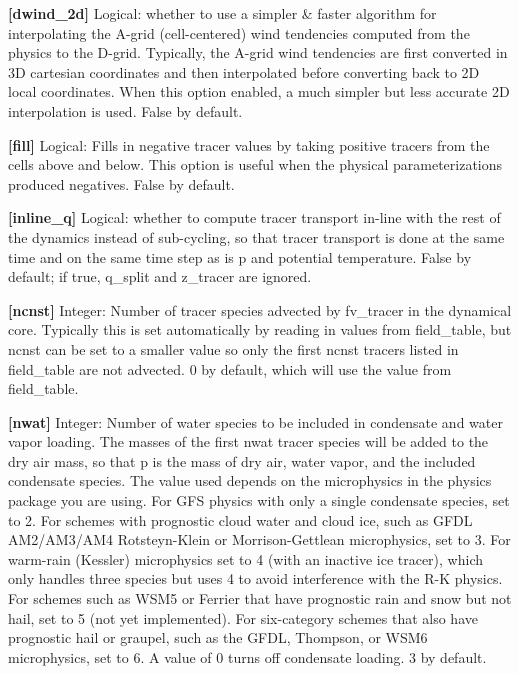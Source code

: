 {\bfseries \mbox{[}dwind\+\_\+2d\mbox{]}} Logical\+: whether to use a simpler \& faster algorithm for interpolating the A-\/grid (cell-\/centered) wind tendencies computed from the physics to the D-\/grid. Typically, the A-\/grid wind tendencies are first converted in 3D cartesian coordinates and then interpolated before converting back to 2D local coordinates. When this option enabled, a much simpler but less accurate 2D interpolation is used. False by default.

{\bfseries \mbox{[}fill\mbox{]}} Logical\+: Fills in negative tracer values by taking positive tracers from the cells above and below. This option is useful when the physical parameterizations produced negatives. False by default.

{\bfseries \mbox{[}inline\+\_\+q\mbox{]}} Logical\+: whether to compute tracer transport in-\/line with the rest of the dynamics instead of sub-\/cycling, so that tracer transport is done at the same time and on the same time step as is {\ttfamily p} and potential temperature. False by default; if true, q\+\_\+split and z\+\_\+tracer are ignored.

{\bfseries \mbox{[}ncnst\mbox{]}} Integer\+: Number of tracer species advected by fv\+\_\+tracer in the dynamical core. Typically this is set automatically by reading in values from field\+\_\+table, but ncnst can be set to a smaller value so only the first ncnst tracers listed in field\+\_\+table are not advected. 0 by default, which will use the value from field\+\_\+table.

{\bfseries \mbox{[}nwat\mbox{]}} Integer\+: Number of water species to be included in condensate and water vapor loading. The masses of the first nwat tracer species will be added to the dry air mass, so that {\ttfamily p} is the mass of dry air, water vapor, and the included condensate species. The value used depends on the microphysics in the physics package you are using. For G\+FS physics with only a single condensate species, set to 2. For schemes with prognostic cloud water and cloud ice, such as G\+F\+DL A\+M2/\+A\+M3/\+A\+M4 Rotsteyn-\/\+Klein or Morrison-\/\+Gettlean microphysics, set to 3. For warm-\/rain (Kessler) microphysics set to 4 (with an inactive ice tracer), which only handles three species but uses 4 to avoid interference with the R-\/K physics. For schemes such as W\+S\+M5 or Ferrier that have prognostic rain and snow but not hail, set to 5 (not yet implemented). For six-\/category schemes that also have prognostic hail or graupel, such as the G\+F\+DL, Thompson, or W\+S\+M6 microphysics, set to 6. A value of 0 turns off condensate loading. 3 by default.

